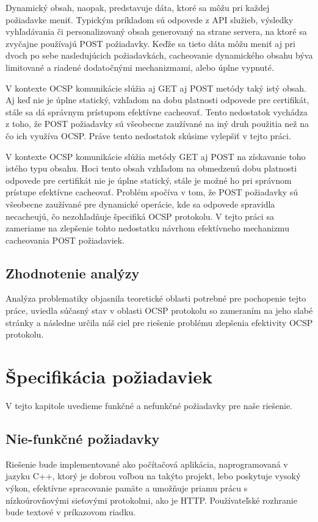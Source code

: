 \documentclass[12pt, twoside]{book}
\begin{document}
Dynamický obsah, naopak, predstavuje dáta, ktoré sa môžu pri každej požiadavke meniť. Typickým príkladom sú odpovede z API služieb, výsledky vyhľadávania či personalizovaný obsah generovaný na strane servera, na ktoré sa zvyčajne používajú POST požiadavky. Keďže sa tieto dáta môžu meniť aj pri dvoch po sebe nasledujúcich požiadavkách, cacheovanie dynamického obsahu býva limitované a riadené dodatočnými mechanizmami, alebo úplne vypnuté.\cite{rfc9110}

V kontexte OCSP komunikácie slúžia aj GET aj POST metódy taký istý obsah. Aj keď nie je úplne statický, vzhľadom na dobu platnosti odpovede pre certifikát, stále sa dá správnym prístupom efektívne cacheovať. Tento nedostatok vychádza z toho, že POST požiadavky sú všeobecne zaužívané na iný druh použitia než na čo ich využíva OCSP. Práve tento nedostatok skúsime vylepšiť v tejto práci.

V kontexte OCSP komunikácie slúžia metódy GET aj POST na získavanie toho istého typu obsahu. Hoci tento obsah vzhľadom na obmedzenú dobu platnosti odpovede pre certifikát nie je úplne statický, stále je možné ho pri správnom prístupe efektívne cacheovať. Problém spočíva v tom, že POST požiadavky sú všeobecne zaužívané pre dynamické operácie, kde sa odpovede spravidla necacheujú, čo nezohľadňuje špecifiká OCSP protokolu. V tejto práci sa zameriame na zlepšenie tohto nedostatku návrhom efektívneho mechanizmu cacheovania POST požiadaviek.


\subsection{Zhodnotenie analýzy}
Analýza problematiky objasnila teoretické oblasti potrebné pre pochopenie tejto práce, uviedla súčasný stav v oblasti OCSP protokolu so zameraním na jeho slabé stránky a následne určila náš ciel pre riešenie problému zlepšenia efektivity OCSP protokolu.



\section{Špecifikácia požiadaviek}
V tejto kapitole uvedieme funkčné a nefunkčné požiadavky pre naše riešenie.

\subsection{Nie-funkčné požiadavky}
Riešenie bude implementované ako počítačová aplikácia, naprogramovaná v jazyku C++, ktorý je dobrou voľbou na takýto projekt, lebo poskytuje vysoký výkon, efektívne spracovanie pamäte a umožňuje priamu prácu s nízkoúrovňovými sieťovými protokolmi, ako je HTTP.
Používateľské rozhranie bude textové v príkazovom riadku.
\end{document}
